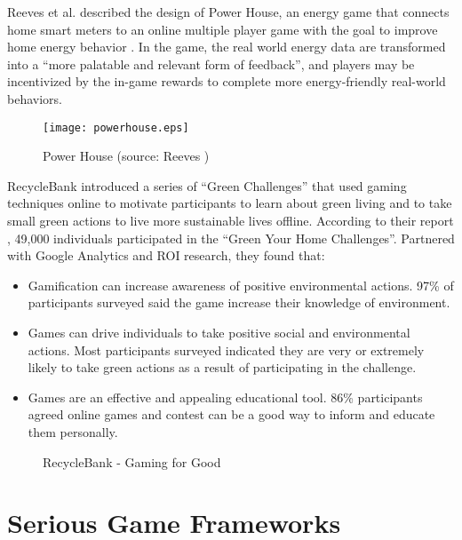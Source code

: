 Reeves et al. described the design of Power House, an energy game that connects
home smart meters to an online multiple player game with the goal to improve
home energy behavior \cite{Reeves2011powerhouse}. In the game, the real world
energy data are transformed into a ``more palatable and relevant form of
feedback'', and players may be incentivized by the in-game rewards to complete
more energy-friendly real-world behaviors.

\begin{figure}[htbp]
	\centering
		\texttt{[image: powerhouse.eps]}
		\caption{Power House (source: Reeves \cite{Reeves2011powerhouse})}
		\label{fig:powerhouse}
\end{figure}

RecycleBank \cite {recyclebank} introduced a series of ``Green Challenges'' that used gaming techniques online to motivate participants to learn about green living and to take small green actions to live more sustainable lives offline. According to their report \cite {gamingforgood}, 49,000 individuals participated in the ``Green Your Home Challenges''. Partnered with Google Analytics and ROI research, they found that:
\begin{itemize}
	\item Gamification can increase awareness of positive environmental actions. 97\% of participants surveyed said the game increase their knowledge of environment.
	\item Games can drive individuals to take positive social and environmental actions. Most participants surveyed indicated they are very or extremely likely to take green actions as a result of participating in the challenge.
	\item Games are an effective and appealing educational tool. 86\% participants agreed online games and contest can be a good way to inform and educate them personally.
\end{itemize}

\begin{figure}[htbp]
	\centering
		\caption{RecycleBank - Gaming for Good}
		\label{fig:recyclebank}
\end{figure}

\section{Serious Game Frameworks}

